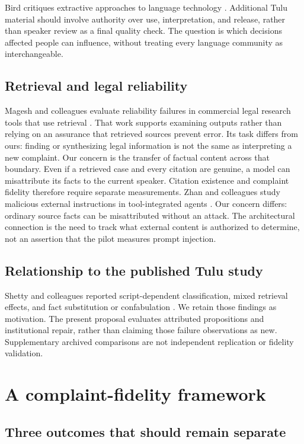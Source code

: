 \documentclass[manuscript,screen,review,anonymous]{acmart}
\begin{document}
Bird critiques extractive approaches to language technology \cite{bird}. Additional Tulu material should involve authority over use, interpretation, and release, rather than speaker review as a final quality check. The question is which decisions affected people can influence, without treating every language community as interchangeable.

\subsection{Retrieval and legal reliability}

Magesh and colleagues evaluate reliability failures in commercial legal research tools that use retrieval \cite{magesh}. That work supports examining outputs rather than relying on an assurance that retrieved sources prevent error. Its task differs from ours: finding or synthesizing legal information is not the same as interpreting a new complaint. Our concern is the transfer of factual content across that boundary. Even if a retrieved case and every citation are genuine, a model can misattribute its facts to the current speaker. Citation existence and complaint fidelity therefore require separate measurements. Zhan and colleagues study malicious external instructions in tool-integrated agents \cite{injecagent}. Our concern differs: ordinary source facts can be misattributed without an attack. The architectural connection is the need to track what external content is authorized to determine, not an assertion that the pilot measures prompt injection.

\subsection{Relationship to the published Tulu study}

Shetty and colleagues reported script-dependent classification, mixed retrieval effects, and fact substitution or confabulation \cite{prior}. We retain those findings as motivation. The present proposal evaluates attributed propositions and institutional repair, rather than claiming those failure observations as new. Supplementary archived comparisons are not independent replication or fidelity validation.

\section{A complaint-fidelity framework}

\subsection{Three outcomes that should remain separate}
\end{document}
